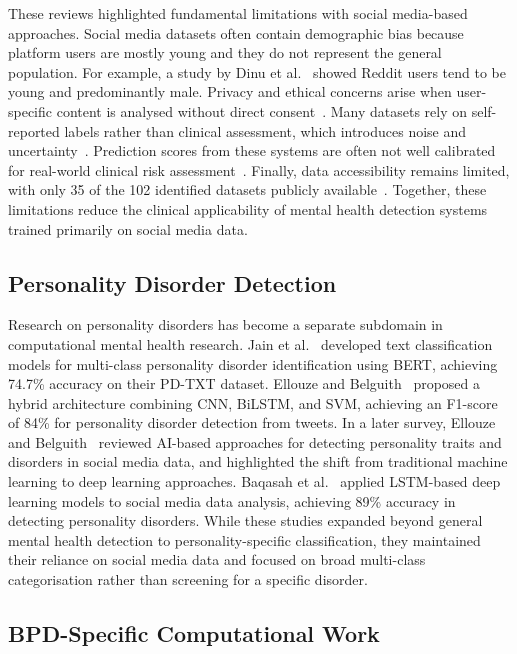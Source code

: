 \documentclass[11pt]{article}
\begin{document}
These reviews highlighted fundamental limitations with social media-based approaches. Social
media datasets often contain demographic bias because platform users are mostly young and they do
not represent the general population. For example, a study by Dinu et
al.~\cite{dinu2021automatic} showed Reddit users tend to be young and predominantly male.
Privacy and ethical concerns arise when user-specific content is analysed without direct
consent~\cite{montejo2024survey}. Many datasets rely on self-reported labels rather than clinical
assessment, which introduces noise and uncertainty~\cite{jiang-etal-2020-detection}. Prediction
scores from these systems are often not well calibrated for real-world clinical risk
assessment~\cite{jiang-etal-2020-detection}. Finally, data accessibility remains limited, with
only 35 of the 102 identified datasets publicly available~\cite{harrigian2021state}. Together,
these limitations reduce the clinical applicability of mental health detection systems trained
primarily on social media data.

\subsection{Personality Disorder Detection}

Research on personality disorders has become a separate subdomain in computational mental health
research. Jain et al.~\cite{jain2024} developed text classification models for multi-class
personality disorder identification using BERT, achieving 74.7\% accuracy on their PD-TXT
dataset. Ellouze and Belguith~\cite{ellouze2022hybrid} proposed a hybrid architecture combining
CNN, BiLSTM, and SVM, achieving an F1-score of 84\% for personality disorder detection from
tweets. In a later survey, Ellouze and Belguith~\cite{ellouze2024artificial} reviewed AI-based
approaches for detecting personality traits and disorders in social media data, and highlighted
the shift from traditional machine learning to deep learning approaches. Baqasah et
al.~\cite{baqasah2024personality} applied LSTM-based deep learning models to social media data
analysis, achieving 89\% accuracy in detecting personality disorders. While these studies
expanded beyond general mental health detection to personality-specific classification, they
maintained their reliance on social media data and focused on broad multi-class categorisation
rather than screening for a specific disorder.

\subsection{BPD-Specific Computational Work}
\end{document}
